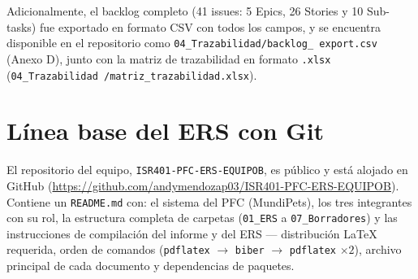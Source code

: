 \documentclass[journal,onecolumn]{IEEEtran}
\begin{document}
	Adicionalmente, el backlog completo (41 issues: 5 Epics, 26 Stories y 10 Sub-tasks) fue exportado en formato CSV con todos los campos, y se encuentra disponible en el repositorio como \texttt{04\_Trazabilidad/backlog\_
		export.csv} (Anexo D), junto con la matriz de trazabilidad en formato \texttt{.xlsx} (\texttt{04\_Trazabilidad
		/matriz\_trazabilidad.xlsx}).
	
	\section{Línea base del ERS con Git}
	
	El repositorio del equipo, \texttt{ISR401-PFC-ERS-EQUIPOB}, es público y está alojado en GitHub (\url{https://github.com/andymendozap03/ISR401-PFC-ERS-EQUIPOB}). Contiene un \texttt{README.md} con: el sistema del PFC (MundiPets), los tres integrantes con su rol, la estructura completa de carpetas (\texttt{01\_ERS} a \texttt{07\_Borradores}) y las instrucciones de compilación del informe y del ERS --- distribución LaTeX requerida, orden de comandos (\texttt{pdflatex} $\rightarrow$ \texttt{biber} $\rightarrow$ \texttt{pdflatex} $\times 2$), archivo principal de cada documento y dependencias de paquetes.
	
\end{document}
